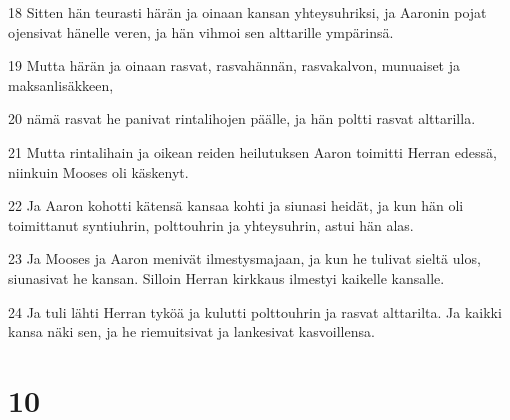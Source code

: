 \par 18 Sitten hän teurasti härän ja oinaan kansan yhteysuhriksi, ja Aaronin pojat ojensivat hänelle veren, ja hän vihmoi sen alttarille ympärinsä.
\par 19 Mutta härän ja oinaan rasvat, rasvahännän, rasvakalvon, munuaiset ja maksanlisäkkeen,
\par 20 nämä rasvat he panivat rintalihojen päälle, ja hän poltti rasvat alttarilla.
\par 21 Mutta rintalihain ja oikean reiden heilutuksen Aaron toimitti Herran edessä, niinkuin Mooses oli käskenyt.
\par 22 Ja Aaron kohotti kätensä kansaa kohti ja siunasi heidät, ja kun hän oli toimittanut syntiuhrin, polttouhrin ja yhteysuhrin, astui hän alas.
\par 23 Ja Mooses ja Aaron menivät ilmestysmajaan, ja kun he tulivat sieltä ulos, siunasivat he kansan. Silloin Herran kirkkaus ilmestyi kaikelle kansalle.
\par 24 Ja tuli lähti Herran tyköä ja kulutti polttouhrin ja rasvat alttarilta. Ja kaikki kansa näki sen, ja he riemuitsivat ja lankesivat kasvoillensa.

\chapter{10}

